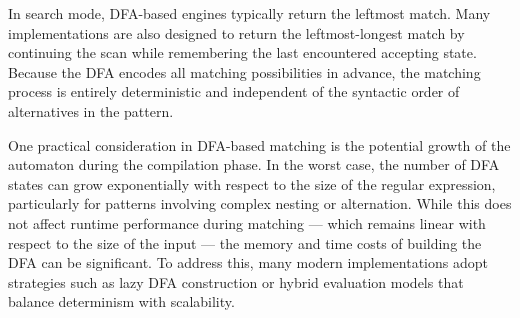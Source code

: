 In search mode, DFA-based engines typically return the leftmost match. Many implementations are also designed to return the leftmost-longest match by continuing the scan while remembering the last encountered accepting state. Because the DFA encodes all matching possibilities in advance, the matching process is entirely deterministic and independent of the syntactic order of alternatives in the pattern.

One practical consideration in DFA-based matching is the potential growth of the automaton during the compilation phase. In the worst case, the number of DFA states can grow exponentially with respect to the size of the regular expression, particularly for patterns involving complex nesting or alternation. While this does not affect runtime performance during matching — which remains linear with respect to the size of the input — the memory and time costs of building the DFA can be significant. To address this, many modern implementations adopt strategies such as lazy DFA construction or hybrid evaluation models that balance determinism with scalability.


%

